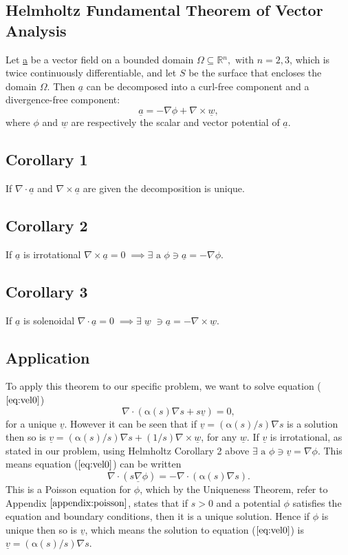 \documentclass[11pt]{article}
\newcommand{\ul}{\underline}
\newcommand{\al}{\mathrm{\alpha}}
\begin{document}
\begin{appendices}
\appendixpage
\section{Helmholtz Fundamental Theorem of Vector Analysis}
\label{appendix:helmholtz}
Let \underline{a} be a vector field on a bounded domain $\Omega \subseteq \mathbb{R}{^n}, \text{ with }n=2,3$, which is twice continuously differentiable, and let $S$ be the surface that encloses the domain $\Omega$. Then $\underline{a}$ can be decomposed into a curl-free component and a divergence-free component:
$$\underline{a} =-\nabla\phi+\nabla \times \underline {w},$$
where $\phi$ and $\underline{w}$ are respectively the scalar and vector potential of $\underline{a}$.
\subsection{Corollary 1}
If $\nabla\cdot{\underline{a}}$ and $\nabla\times{\underline{a}}$ are given the decomposition is unique.
\subsection{Corollary 2}
If  $\underline{a}$ is irrotational  $\nabla\times{\underline{a}} = 0\; \implies \exists \text{ a } \phi \ni \underline{a} = -\nabla{\phi}$.
\subsection{Corollary 3}
If  $\underline{a}$ is solenoidal  $\nabla\cdot{\underline{a}} = 0\; \implies \exists \; \underline{w} \;\ni \underline{a} = -\nabla\times\underline{w}$.
\subsection{Application}
To apply this theorem to our specific problem, we want to solve equation ($\ref{eq:vel0}$) 
$$\nabla\cdot\left(\al(s)\nabla{s} + s\underline{v}\right)=0,$$ 
for a unique $\ul{v}$. However it can be seen that if $\ul{v} = (\al{(s)}/s)\nabla{s}$ is a solution then so is $\ul{v} = (\al{(s)}/s)\nabla{s} + (1/s)\nabla\times{\ul{w}}$, for any $\ul{w}$.
If $\ul{v}$ is irrotational, as stated in our problem, using Helmholtz Corollary 2 above $ \exists \text{ a } \phi \ni \underline{v} = \nabla{\phi}.$
This means equation ($\ref{eq:vel0}$) can be written 
\begin{equation}
\label{eq:Poisson1}
\nabla\cdot(s\underline{\nabla}{\phi}) = - \nabla\cdot(\al(s)\nabla{s}).
\end{equation}
This is a Poisson equation for $\phi$, which by the Uniqueness Theorem, refer to Appendix $\ref{appendix:poisson}$, states that if $s>0$ and a potential $\phi$ satisfies the equation and boundary
 conditions, then it is a unique solution.
Hence if $\phi$ is unique then so is $\ul{v}$, which means the solution to equation ($\ref{eq:vel0}$) is $\ul{v} = (\al{(s)}/s)\nabla{s}$.


\end{appendices}
\end{document}
